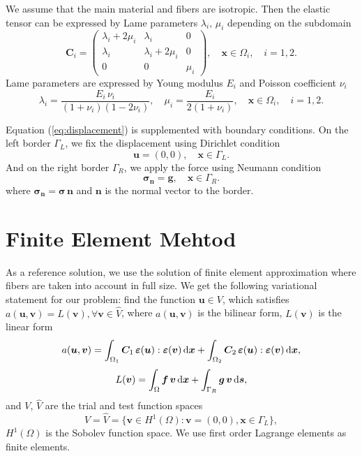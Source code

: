 \documentclass[a4paper]{jpconf}
\begin{document}
We assume that the main material and fibers are isotropic. Then the elastic tensor can be expressed by Lame parameters $\lambda_i,\, \mu_i$ depending on the subdomain
\[
\bm{C}_i = \left( \begin{matrix}
\lambda_i+2\mu_i & \lambda_i & 0  \\
\lambda_i & \lambda_i+2\mu_i & 0  \\
0 & 0 & \mu_i 
\end{matrix}  \right), \quad \bm{x} \in \Omega_i, \quad i=1,2.
\]
Lame parameters are expressed by Young modulus $E_i$ and Poisson coefficient $\nu_i$
\[
\lambda_i = \frac{E_i\, \nu_i}{(1 + \nu_i) (1 - 2 \nu_i)}, \quad
\mu_i = \frac{E_i}{2 (1 + \nu_i)}, \quad \bm{x} \in \Omega_i, \quad i=1,2.
\]

Equation (\ref{eq:displacement}) is supplemented with boundary conditions. On the left border $\Gamma_L$, we fix the displacement using Dirichlet condition
\[
\bm{u} = (0, 0), \quad \bm{x} \in \Gamma_L.
\]
And on the right border $\Gamma_R$, we apply the force using Neumann condition
\[
\bm{\sigma}_{\bm{n}} = \bm{g}, \quad \bm{x} \in \Gamma_R.
\]
where $\bm{\sigma}_{\bm{n}}=\bm{\sigma}\,\bm{n}$ and $\bm{n}$ is the normal vector to the border.

\section{Finite Element Mehtod}

As a reference solution, we use the solution of finite element approximation where fibers are taken into account in full size.
We get the following variational statement for our problem: find the function $\bm{u} \in V$, which satisfies  $a(\bm{u},\bm{v}) = L(\bm{v}), \forall \bm{v} \in \widehat{V}$, where $a(\bm{u}, \bm{v})$ is the bilinear form, $L(\bm{v})$ is the linear form
\begin{equation}
a(\bm{u}, \bm{v}) = \int_{\Omega_1} \bm{C}_1 \, \bm{\varepsilon}(\bm{u}): \bm{\varepsilon}(\bm{v})\, {\rm d}\bm{x} + \int_{\Omega_2} \bm{C}_2 \, \bm{\varepsilon}(\bm{u}) : \bm{\varepsilon}(\bm{v}) \,{\rm d}\bm{x},
\label{eq:bilinear-fem}
\end{equation}
\begin{equation}
L(\bm{v}) = \int_{\Omega}\bm{f}\, \bm{v}\, {\rm d}\bm{x} + \int_{\Gamma_R}\bm{g}\, \bm{v}\, {\rm d}\bm{s},
\label{eq:linear-fem}
\end{equation}
and $V$, $\widehat{V}$ are the trial and test function spaces
\[
V = \widehat{V} = \{\bm{v} \in H^1(\Omega) : \bm{v} = (0, 0), \bm{x} \in \Gamma_L \},
\]
$H^1(\Omega)$ is the Sobolev function space. We use first order Lagrange elements as finite elements.
\end{document}
